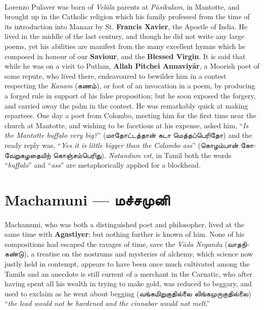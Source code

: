 \documentclass{article}
\newcommand{\TamilText}[1]{\texttamil{#1}}
\newcommand{\TamilBold}[1]{\texttamil{\textbf{#1}}}
\newcommand{\tam}[1]{\TamilText{#1}}
\newcommand{\tambold}[1]{\TamilBold{#1}}
\begin{document}
\paragraph{}
Lorenzo Pulaver was born of \emph{Vel\={a}la} parents at \emph{P\={a}sikulam}, in Mantotte, and brought up in the Catholic religion which his family professed from the time of its introduction into Manaar by St. \textbf{Francis Xavier}, the Apostle of India. He lived in the middle of the last century, and though he did not write any large poems, yet his abilities are manifest from the many excellent hymns which he composed in honour of our \textbf{Saviour}, and the \textbf{Blessed Virgin}. It is said that while he was on a visit to Putlam, \textbf{Allah Pitchei Annaviy\={a}r}, a Moorish poet of some repute, who lived there, endeavoured to bewilder him in a contest respecting the \emph{Kanam} (\tam{கணம்}), or foot of an invocation in a poem, by producing a forged rule in support of his false proposition; but he soon exposed the forgery, and carried away the palm in the contest. He was remarkably quick at making repartees. One day a poet from Colombo, meeting him for the first time near the church at Mantotte, and wishing to be facetious at his expense, asked him, ``\emph{Is the Mantotte buffalo very big?}'' (\tam{மாதோட்டத்தான் கடா மெத்தப்பெரிதோ}) and the ready reply was, ``\emph{Yes it is little bigger than the Colombo ass}'' (\tam{கொழம்பான் கோவேறுகழதையிற் கொஞ்சம்பெரிது}). \emph{Notandum est}, in Tamil both the words ``\emph{buffalo}'' and ``\emph{ass}'' are metaphorically applied for a blockhead.

\section{Machamuni --- \tambold{மச்சமுனி}}
\paragraph{}
Machamuni, who was both a distinguished poet and philosopher, lived at the same time with \textbf{Agastiyer}; but nothing further is known of him. None of his compositions had escaped the ravages of time, save the \emph{V\={a}da Negandu} (\tam{வாதநிகண்டு}), a treatise on the nostrums and mysteries of alchemy, which science now justly held in contempt, appears to have been once much cultivated among the Tamils and an anecdote is still current of a merchant in the Carnatic, who after having spent all his wealth in trying to make gold, was reduced to beggary, and used to exclaim as he went about begging (\tam{வங்கமிறுகுதில்லை லிங்கமுருகுதில்லை}) ``\emph{the lead would not be hardened and the cinnabar would not melt}.''
\end{document}

